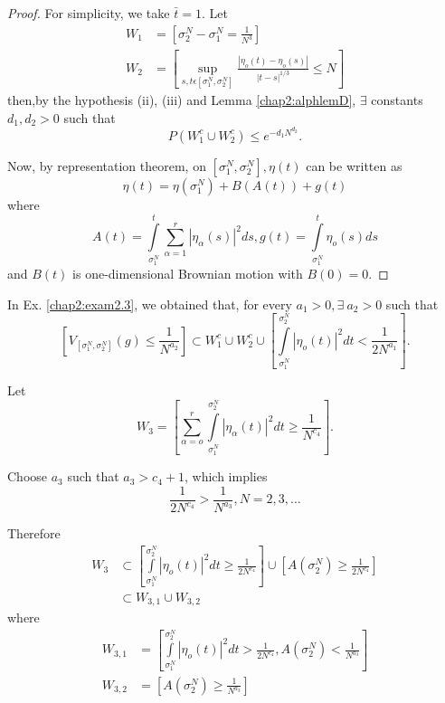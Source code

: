\begin{proof}
  For simplicity, we take $\bar{t} = 1 $. Let 
  \begin{align*}
    W_1&= \left[\sigma_{2}^{N} - \sigma_{1}^{N}= \frac{1}{N^3}\right]\\
    W_2 &= \left[ \sup_{s, t \epsilon  [ \sigma_{1}^{N},
          \sigma_{2}^{N}]}\frac{| \eta _o (t) - \eta_o (s)|}{|t -s |
        ^{1/3}} \leq N\right] 
  \end{align*}
  then,\pageoriginale by the hypothesis (ii), (iii) and Lemma
  \ref{chap2:alphlemD},
  $\exists$ constants $d_1, d_2 > 0 $ such that   
  \begin{equation*}
    P(W_1^c \cup W_2^c) \leq e^{-d_{1}N^{d_{2}}}. \tag{2.7}\label{eq2.7}
  \end{equation*}

  Now, by representation theorem, on $[\sigma_1^N, \sigma_2^N], \eta
  (t)$ can  be written as  
  \begin{equation*}
    \eta (t) = \eta ( \sigma_1^N ) + B(A(t)) + g(t) \tag{2.8}\label{eq2.8}
  \end{equation*}
  where
  $$
  A(t) = \int\limits_{\sigma_{1}^{N}}^{t}\sum_{\alpha = 1}^{r} | \eta
  _{\alpha }(s) |^2 ds, g (t) = \int\limits_{\sigma_{1}^{N}}^{t}\eta_o (s) ds 
  $$
  and $B(t)$ is one-dimensional Brownian motion with $B(0) = 0$.
\end{proof}

In Ex. \ref{chap2:exam2.3}, we obtained that, for every $a_1 > 0,
\exists~ a_2 > 0 $ such that  
\begin{equation*}
  \left[V_{[\sigma_{1}^{N},  \sigma_{2}^{N}]}  (g) \leq
    \frac{1}{N^{a_{2}}}\right] \subset W_1 ^c \cup W_2 ^c \cup
  \left[\int\limits_{\sigma_{1}^{N}}^{\sigma_{2}^{N}} | \eta_o (t) |^2 dt <
    \frac{1}{2N^{a_{1}}}\right]. \tag{2.9}\label{eq2.9} 
\end{equation*}

Let
$$
W_3 = \left[\sum_{\alpha = o}^{r} \int\limits_{
    \sigma_{1}^{N}}^{\sigma_{2}^{N}}| \eta_{\alpha}(t) |^2 dt \geq
  \frac{1}{N^{c_{4}}}\right].  
$$

Choose $a_3$ such that $a_3 > c_4 + 1$, which implies
$$
\frac{1}{2N^{c_{4}}} > \frac{1}{N^{a_{3}}}, N= 2, 3, \ldots 
$$

Therefore
\begin{align*}
  W_3 &\subset \left[ \int\limits_{\sigma_{1}^{N}}^{\sigma_{2}^{N}} |
    \eta_o (t) |^2 dt \geq \frac{1}{2N^{c_{4}}}\right] \cup \left[A
    \left(\sigma_{2}^{N}\right) \geq \frac{1}{2N^{c_{4}}} \right] \\ 
  &\subset W_{3, 1}\cup W_{3,2} 
\end{align*} 
where
\begin{align*}
  W_{3, 1}&= \left[\int\limits_{\sigma_{1}^{N}}^{\sigma_{2}^{N}} | \eta_o
    (t) |^2 dt > \frac{1}{2N^{c_{4}}}, A\left(\sigma_{2}^{N}\right) <
    \frac{1}{N^{a_{3}}}\right]\\ 
  W_{3, 2}&= \left[A\left(\sigma_{2}^{N}\right)\geq
    \frac{1}{N^{a_{3}}} \right]
\end{align*}\pageoriginale

